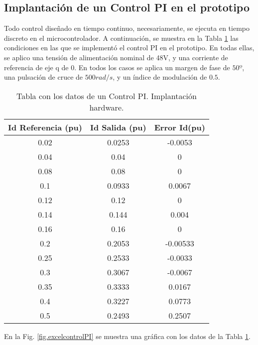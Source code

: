 \documentclass{report}
\begin{document}
\subsection{Implantación de un Control PI en el prototipo} \label{sec.implantacioncontrolPI}

Todo control diseñado en tiempo continuo, necesariamente, se ejecuta en tiempo discreto en el microcontrolador. A continuación, se muestra en la Tabla \ref{tab.datosimplantacioncontrolPI} las condiciones en las que se implementó el control PI en el prototipo. En todas ellas, se aplico una tensión de alimentación nominal de 48V, y una corriente de referencia de eje q de 0. En todos los casos se aplica un margen de fase de $50º$, una pulsación de cruce de $500 rad/s$, y un índice de modulación de $0.5$.

\begin{table}[!h]
    \begin{center}
    \begin{tabular}{|c|c|c|} \hline\hline\hline
    \textbf{Id Referencia (pu)} & \textbf{Id Salida (pu)} & \textbf{Error Id(pu)} \\ \hline
    0.02 & 0.0253 & -0.0053 \\ \hline
    0.04&  0.04 & 0\\ \hline   
    0.08 & 0.08 & 0\\ \hline
    0.1 & 0.0933 & 0.0067\\ \hline 
    0.12 & 0.12 & 0\\ \hline 
    0.14 & 0.144 & 0.004\\ \hline 
    0.16 & 0.16 & 0\\ \hline 
    0.2 & 0.2053 & -0.00533\\ \hline 
    0.25 & 0.2533 & -0.0033\\ \hline 
    0.3 & 0.3067 & -0.0067\\ \hline 
    0.35 & 0.3333 & 0.0167\\ \hline 
    0.4 & 0.3227& 0.0773\\ \hline 
    0.5 & 0.2493 & 0.2507\\ \hline 

    \end{tabular}
    \end{center}
    \caption{Tabla con los datos de un Control PI. Implantación hardware.} \label{tab.datosimplantacioncontrolPI}
\end{table}

En la Fig. \ref{fig.excelcontrolPI} se muestra una gráfica con los datos de la Tabla \ref{tab.datosimplantacioncontrolPI}.
\end{document}

